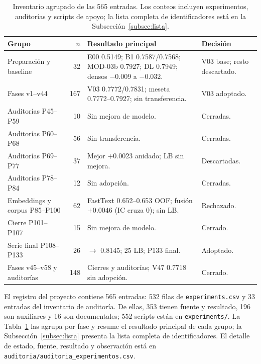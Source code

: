 \label{app:inventario}

\begin{table}[!t]
\centering
\caption{Inventario agrupado de las 565 entradas. Los conteos incluyen
experimentos, auditorías y scripts de apoyo; la lista completa de
identificadores está en la Subsección~\ref{subsec:lista}.}
\label{tab:inventario}
\scriptsize
\begin{tabularx}{\textwidth}{@{}>{\raggedright\arraybackslash}p{4.2cm}r>{\raggedright\arraybackslash}X>{\raggedright\arraybackslash}p{2.8cm}@{}}
\toprule
Grupo & $n$ & Resultado principal & Decisión \\
\midrule
Preparación y baseline & 32 & E00 0.5149; B1 0.7587/0.7568; MOD-03b 0.7927; DL 0.7949; densos $-0.009$ a $-0.032$. & V03 base; resto descartado. \\
Fases v1--v44 & 167 & V03 0.7772/0.7831; meseta 0.7772--0.7927; sin transferencia. & V03 adoptado. \\
Auditorías P45--P59 & 10 & Sin mejora de modelo. & Cerradas. \\
Auditorías P60--P68 & 56 & Sin transferencia. & Cerradas. \\
Auditorías P69--P77 & 37 & Mejor $+0.0023$ anidado; LB sin mejora. & Descartadas. \\
Auditorías P78--P84 & 12 & Sin adopción. & Cerradas. \\
Embeddings y corpus P85--P100 & 62 & FastText 0.652--0.653 OOF; fusión $+0.0046$ (IC cruza 0); sin LB. & Rechazado. \\
Cierre P101--P107 & 15 & Sin mejora de modelo. & Cerrado. \\
Serie final P108--P133 & 26 & 0.7886 $\to$ 0.8145; 25 LB; P133 final. & Adoptado. \\
Fases v45--v58 y auditorías & 148 & Cierres y auditorías; V47 0.7718 sin adopción. & Cerrado. \\
\bottomrule
\end{tabularx}
\end{table}

El registro del proyecto contiene 565 entradas: 532 filas de
\texttt{experiments.csv} y 33 entradas del inventario de auditoría. De ellas,
353 tienen fuente y resultado, 196 son auxiliares y 16 son documentales; 552
scripts están en \texttt{experiments/}. La Tabla~\ref{tab:inventario} las
agrupa por fase y resume el resultado principal de cada grupo; la
Subsección~\ref{subsec:lista} presenta la lista completa de identificadores.
El detalle de estado, fuente, resultado y observación está en
\texttt{auditoria/auditoria\_\allowbreak{}experimentos.csv}.



